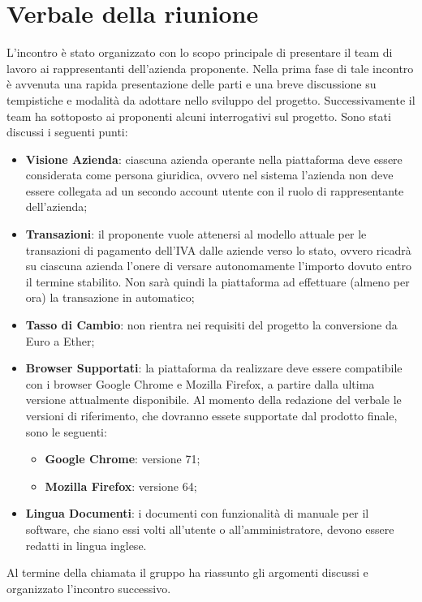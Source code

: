 \section{Verbale della riunione}
L'incontro è stato organizzato con lo scopo principale di presentare il team di
lavoro ai rappresentanti dell'azienda proponente. Nella prima fase di tale 
incontro è avvenuta una rapida presentazione delle parti e una breve discussione
su tempistiche e modalità da adottare nello sviluppo del progetto. Successivamente 
il team ha sottoposto ai proponenti alcuni interrogativi sul progetto.
Sono stati discussi i seguenti punti: 
\begin{itemize}
	\item \textbf{Visione Azienda}: ciascuna azienda operante nella piattaforma
			 deve essere considerata come persona giuridica, ovvero nel sistema 
			 l'azienda non deve essere collegata ad un secondo account utente con
			 il ruolo di rappresentante dell'azienda;
	\item \textbf{Transazioni}: il proponente vuole attenersi al modello attuale 
			per le transazioni di pagamento dell'IVA dalle aziende verso lo stato,
			ovvero ricadrà su ciascuna azienda l'onere di versare autonomamente 
			l'importo dovuto entro il termine stabilito. Non sarà quindi la piattaforma
			ad effettuare (almeno per ora) la transazione in automatico;
	\item \textbf{Tasso di Cambio}: non rientra nei requisiti del progetto la conversione
			da Euro a Ether\glo{};
	\item \textbf{Browser Supportati}: la piattaforma da realizzare deve essere compatibile
			con i browser Google Chrome e Mozilla Firefox, a partire dalla ultima versione 
			attualmente disponibile. Al momento della redazione del verbale le versioni di 
			riferimento, che dovranno essete supportate dal prodotto finale, sono le seguenti:
	\begin{itemize}
		\item \textbf{Google Chrome}: versione 71;
		\item \textbf{Mozilla Firefox}: versione 64;
	\end{itemize}
	\item \textbf{Lingua Documenti}: i documenti con funzionalità di manuale per il software, che siano essi volti all'utente o all'amministratore, devono essere redatti in lingua inglese.

\end{itemize}
Al termine della chiamata il gruppo ha riassunto gli argomenti discussi e organizzato l'incontro successivo.

